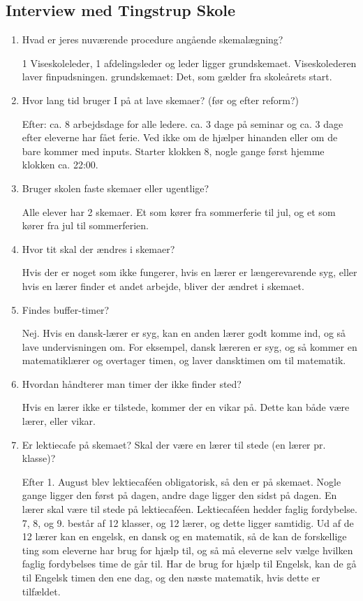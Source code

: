 \subsection{Interview med Tingstrup Skole}
\label{InterviewTingstrup}
\begin{enumerate}
	\item Hvad er jeres nuværende procedure angående skemalægning?
	
	1 Viseskoleleder, 1 afdelingsleder og leder ligger grundskemaet. Viseskolederen laver finpudsningen.
	grundskemaet: Det, som gælder fra skoleårets start.
	\item Hvor lang tid bruger I på at lave skemaer? (før og efter reform?)
	
	Efter: ca. 8 arbejdsdage for alle ledere. ca. 3 dage på seminar og ca. 3 dage efter eleverne har fået ferie. Ved ikke om de hjælper hinanden eller om de bare kommer med inputs. Starter klokken 8, nogle gange først hjemme klokken ca. 22:00.
	\item Bruger skolen faste skemaer eller ugentlige?
	
	Alle elever har 2 skemaer. Et som kører fra sommerferie til jul, og et som kører fra jul til sommerferien.
	\item Hvor tit skal der ændres i skemaer?
	
	Hvis der er noget som ikke fungerer, hvis en lærer er længerevarende syg, eller hvis en lærer finder et andet arbejde, bliver der ændret i skemaet.
	\item Findes buffer-timer? 
	
	Nej. Hvis en dansk-lærer er syg, kan en anden lærer godt komme ind, og så lave undervisningen om. For eksempel, dansk læreren er syg, og så kommer en matematiklærer og overtager timen, og laver dansktimen om til matematik.
	\item Hvordan håndterer man timer der ikke finder sted?
	
	Hvis en lærer ikke er tilstede, kommer der en vikar på. Dette kan både være lærer, eller vikar.
	\item Er lektiecafe på skemaet? Skal der være en lærer til stede (en lærer pr. klasse)?
	
	Efter 1. August blev lektiecaf\'een obligatorisk, så den er på skemaet. Nogle gange ligger den først på dagen, andre dage ligger den sidst på dagen.
	En lærer skal være til stede på lektiecaféen. Lektiecaféen hedder faglig fordybelse. 7, 8, og 9. består af 12 klasser, og 12 lærer, og dette ligger samtidig. Ud af de 12 lærer kan en engelsk, en dansk og en matematik, så de kan de forskellige ting som eleverne har brug for hjælp til, og så må eleverne selv vælge hvilken faglig fordybelses time de går til. Har de brug for hjælp til Engelsk, kan de gå til Engelsk timen den ene dag, og den næste matematik, hvis dette er tilfældet.
	

\end{enumerate}
